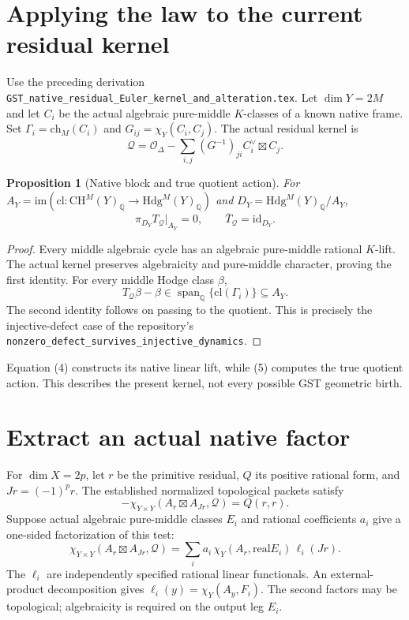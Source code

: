 \documentclass[11pt]{article}
\newcommand{\Q}{\mathbb Q}
\newcommand{\CH}{\mathrm{CH}}
\newcommand{\Hdg}{\mathrm{Hdg}}
\newcommand{\cl}{\mathrm{cl}}
\newcommand{\ch}{\mathrm{ch}}
\newcommand{\im}{\mathrm{im}}
\newcommand{\id}{\mathrm{id}}
\newcommand{\real}{\mathrm{real}}
\newtheorem{proposition}[theorem]{Proposition}
\begin{document}
\section{Applying the law to the current residual kernel}
Use the preceding derivation
\texttt{GST\_native\_residual\_Euler\_kernel\_and\_alteration.tex}.
Let $\dim Y=2M$ and let $C_i$ be the actual algebraic pure-middle
$K$-classes of a known native frame. Set
$\Gamma_i=\ch_M(C_i)$ and $G_{ij}=\chi_Y(C_i,C_j)$.
The actual residual kernel is
\[
 \mathscr Q=\mathcal O_\Delta-
       \sum_{i,j}(G^{-1})_{ji}C_i^\vee\boxtimes C_j.
\]
\begin{proposition}[Native block and true quotient action]
For $A_Y=\im(\cl:\CH^M(Y)_\Q\to\Hdg^M(Y)_\Q)$ and
$D_Y=\Hdg^M(Y)_\Q/A_Y$,
\[
 \boxed{\pi_{D_Y}T_{\mathscr Q}|_{A_Y}=0,\qquad
        \overline T_{\mathscr Q}=\id_{D_Y}.}                    \tag{5}
\]
\end{proposition}
\begin{proof}
Every middle algebraic cycle has an algebraic pure-middle rational
$K$-lift. The actual kernel preserves algebraicity and pure-middle
character, proving the first identity.
For every middle Hodge class $\beta$,
\[
 T_{\mathscr Q}\beta-\beta
 \in\operatorname{span}_\Q\{\cl(\Gamma_i)\}\subseteq A_Y.
\]
The second identity follows on passing to the quotient.
This is precisely the injective-defect case of the repository's
\texttt{nonzero\_defect\_survives\_injective\_dynamics}.
\end{proof}
Equation (4) constructs its native linear lift, while (5)
computes the true quotient action. This describes the present
kernel, not every possible GST geometric birth.

\section{Extract an actual native factor}
For $\dim X=2p$, let $r$ be the primitive residual, $Q$ its
positive rational form, and $Jr=(-1)^p r$. The established
normalized topological packets satisfy
\[
 -\chi_{Y\times Y}(A_r\boxtimes A_{Jr},\mathscr Q)=Q(r,r).         \tag{6}
\]
Suppose actual algebraic pure-middle classes $E_i$ and rational
coefficients $a_i$ give a one-sided factorization of this test:
\[
 \chi_{Y\times Y}(A_r\boxtimes A_{Jr},\mathscr Q)
       =\sum_i a_i\,\chi_Y(A_r,\real E_i)\,\ell_i(Jr).            \tag{7}
\]
The $\ell_i$ are independently specified rational linear functionals.
An external-product decomposition gives
$\ell_i(y)=\chi_Y(A_y,F_i)$.
The second factors may be topological; algebraicity is required
on the output leg $E_i$.
\end{document}

